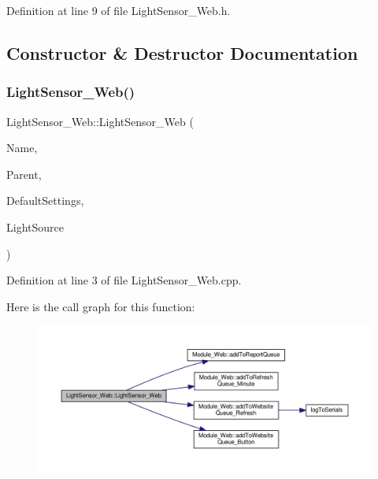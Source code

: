 Definition at line 9 of file Light\+Sensor\+\_\+\+Web.\+h.



\subsection{Constructor \& Destructor Documentation}
\mbox{\label{class_light_sensor___web_a3ebeb8eb8a73bc3d9bc61dc31f668280}} 
\subsubsection{\texorpdfstring{Light\+Sensor\+\_\+\+Web()}{LightSensor\_Web()}}
{\footnotesize\ttfamily Light\+Sensor\+\_\+\+Web\+::\+Light\+Sensor\+\_\+\+Web (\begin{DoxyParamCaption}\item[{const \+\_\+\+\_\+\+Flash\+String\+Helper $\ast$}]{Name,  }\item[{\hyperlink{class_module___web}{Module\+\_\+\+Web} $\ast$}]{Parent,  }\item[{\hyperlink{struct_settings_1_1_light_sensor_settings}{Settings\+::\+Light\+Sensor\+Settings} $\ast$}]{Default\+Settings,  }\item[{\hyperlink{class_lights}{Lights} $\ast$}]{Light\+Source }\end{DoxyParamCaption})}



Definition at line 3 of file Light\+Sensor\+\_\+\+Web.\+cpp.

Here is the call graph for this function\+:
\nopagebreak
\begin{figure}[H]
\begin{center}
\leavevmode
\includegraphics[width=350pt]{class_light_sensor___web_a3ebeb8eb8a73bc3d9bc61dc31f668280_cgraph}
\end{center}
\end{figure}


